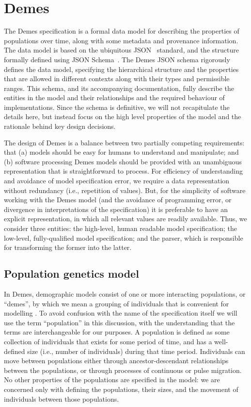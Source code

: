 \documentclass[11pt]{article}
\begin{document}
\section*{Demes}

The Demes specification is a formal data model for describing
the properties of populations over time,
along with some metadata and provenance information.
The data model is based on the ubiquitous JSON~\citep{bray2017javascript}
standard, and the structure formally defined using
JSON Schema~\citep{wright2020json}.
The Demes JSON schema rigorously defines the data model,
specifying the hierarchical structure and the properties that are allowed in different
contexts along with their types and permissible ranges. This schema, and its
accompanying documentation, fully describe the entities in the model and their
relationships and the required behaviour of implementations. Since the
schema is definitive, we will not recapitulate the details
here, but instead focus on the high level properties of the model and
the rationale behind key design decisions.

The design of Demes is a balance between two partially competing requirements:
that (a) models should be easy for humans to understand and manipulate; and (b)
software processing Demes models should be provided with an unambiguous
representation that is straightforward to process. For efficiency of
understanding and avoidance of model specification error, we require a data
representation without redundancy (i.e., repetition of values). But, for the
simplicity of software working with the Demes model (and the avoidance of
programming error, or divergence in interpretations of the specification) it is
preferable to have an explicit representation, in which all relevant values are
readily available. Thus, we consider three entities: the high-level, human
readable model specification; the low-level, fully-qualified model
specification; and the parser, which is responsible for transforming the former
into the latter.

\subsection*{Population genetics model}

In Demes, demographic models consist of one or more interacting populations,
or ``demes'', by which we mean a grouping of individuals that is convenient
for modelling \citep{gilmour_demes_1939,gilmour_deme_1955}.
To avoid confusion with the name of the specification itself we will
use the term ``population'' in this discussion, with the understanding that the
terms are interchangeable for our purposes.
A population is defined as some collection of individuals that exists for
some period of time, and has a well-defined size (i.e., number of individuals)
during that time period. Individuals can move between populations
either through ancestor-descendant relationships between the populations,
or through processes of continuous or pulse migration.
No other properties of the populations are specified in the model:
we are concerned only with defining the populations, their sizes, and the
movement of individuals between those populations.
\end{document}
